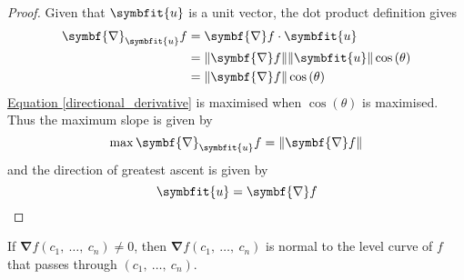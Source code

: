 \documentclass{article}
\begin{document}
\begin{proof}
    Given that $\symbfit{u}$ is a unit vector, the dot product definition
    gives
    \begin{align}
        \symbf{\nabla}_{\symbfit{u}}f &= \symbf{\nabla}f \cdot \symbfit{u} \nonumber \\
        &= \norm{\symbf{\nabla}f} \norm{\symbfit{u}} \cos{\left( \theta \right)} \nonumber \\
        &= \norm{\symbf{\nabla}f} \cos{\left( \theta \right)} \label{directional_derivative}
    \end{align}
    \hyperref[directional_derivative]{Equation \ref{directional_derivative}} is
    maximised when $\cos{\left( \theta \right)}$ is maximised. Thus the
    maximum slope is given by
    \begin{equation*}
        \max \symbf{\nabla}_{\symbfit{u}}f = \norm{\symbf{\nabla}f}
    \end{equation*}
    and the direction of greatest ascent is given by
    \begin{equation*}
        \symbfit{u} = \symbf{\nabla}f
    \end{equation*}
\end{proof}
\begin{theorem}
    If $\symbf{\nabla}f(c_1,\: \ldots,\: c_n) \neq 0$, then $\symbf{\nabla}f(c_1,\: \ldots,\: c_n)$ is normal to the level
    curve of $f$ that passes through $(c_1,\: \ldots,\: c_n)$.
\end{theorem}
\end{document}
